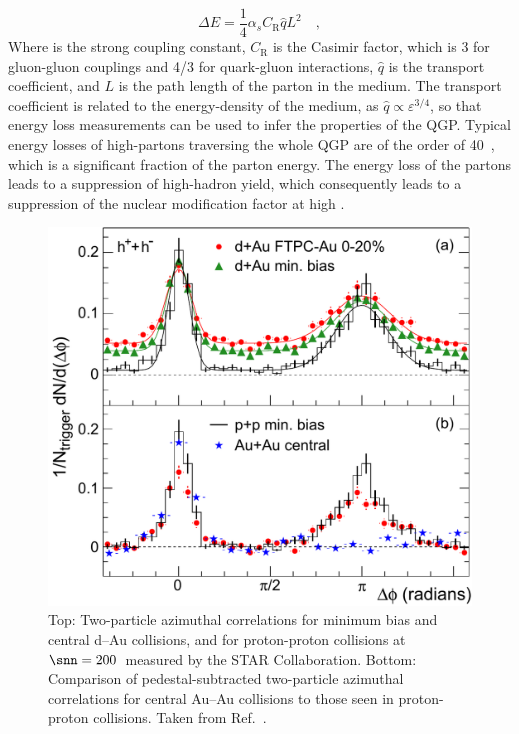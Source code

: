 \begin{equation*}
    \Delta E = \frac{1}{4}\alpha_s C_\mathrm{R}\hat{q}L^2\quad ,
\end{equation*}
Where \als is the strong coupling constant, $C_\mathrm{R}$ is the Casimir factor, which is 3 for gluon-gluon couplings and 4/3 for quark-gluon interactions, $\hat{q}$ is the transport coefficient, and $L$ is the path length of the parton in the medium. The transport coefficient is related to the energy-density of the medium, as $\hat{q} \propto \varepsilon^{3/4}$, so that energy loss measurements can be used to infer the properties of the QGP. Typical energy losses of high-\pt partons traversing the whole QGP are of the order of 40~\gev, which is a significant fraction of the parton energy. The energy loss of the partons leads to a suppression of high-\pt hadron yield, which consequently leads to a suppression of the nuclear modification factor at high \pt. 

\begin{figure}[htb]
  \centering
  \includegraphics[width=0.7\linewidth]{Figures/Chapter 1/dAu_Fig4.pdf}
  \caption{Top: Two-particle azimuthal correlations for minimum bias and central d--Au collisions, and for proton-proton collisions at $\snn = 200$~\gev measured by the STAR Collaboration. Bottom: Comparison of pedestal-subtracted two-particle azimuthal correlations for central Au--Au collisions to those seen in proton-proton collisions. Taken from Ref.~\cite{STAR:2003pjh}.}
  \label{fig:azimuthal_correlations}
\end{figure}


